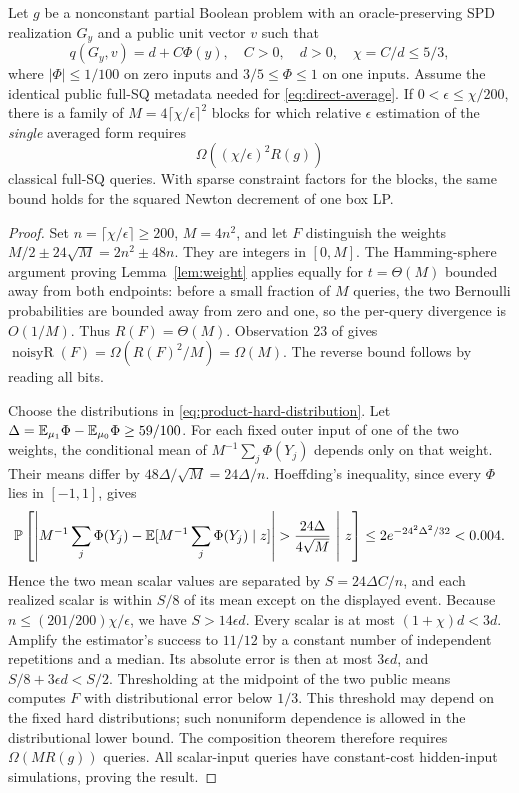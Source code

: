 \begin{theorem}\label{thm:distributional-product}
Let $g$ be a nonconstant partial Boolean problem with an oracle-preserving
SPD realization $G_y$ and a public unit vector $v$ such that
\begin{equation}\label{eq:single-form-signal}
 q(G_y,v)=d+C\Phi(y),\quad C>0,\quad d>0,\quad
 \chi=C/d\leq5/3,
\end{equation}
where $|\Phi|\leq1/100$ on zero inputs and $3/5\leq\Phi\leq1$ on
one inputs. Assume the identical public full-SQ metadata needed for
\eqref{eq:direct-average}. If $0<\epsilon\leq\chi/200$, there is a
family of $M=4\lceil\chi/\epsilon\rceil^2$ blocks for which relative
$\epsilon$ estimation of the \emph{single} averaged form requires
\begin{equation}\label{eq:distributional-product}
             \Omega((\chi/\epsilon)^2R(g))
\end{equation}
classical full-SQ queries. With sparse constraint factors for
the blocks, the same bound holds for the squared Newton decrement of one
box LP.
\end{theorem}
\begin{proof}
Set $n=\lceil\chi/\epsilon\rceil\geq200$, $M=4n^2$, and let $F$
distinguish the weights $M/2\pm24\sqrt M=2n^2\pm48n$.
They are integers in $[0,M]$. The Hamming-sphere argument proving
Lemma~\ref{lem:weight} applies equally for $t=\Theta(M)$ bounded away
from both endpoints: before a small fraction of $M$ queries, the two
Bernoulli probabilities are bounded away from zero and one, so the
per-query divergence is $O(1/M)$. Thus $R(F)=\Theta(M)$.
Observation 23 of \citet{ChakrabortyEtAl2023} gives
$\operatorname{noisyR}(F)=\Omega(R(F)^2/M)=\Omega(M)$.
The reverse bound follows by reading all bits.

Choose the distributions in \eqref{eq:product-hard-distribution}.
Let $\Delta=\mathbb E_{\mu_1}\Phi-\mathbb E_{\mu_0}\Phi\geq59/100$.
For each fixed outer input of one of the two weights, the conditional
mean of $M^{-1}\sum_j\Phi(Y_j)$ depends only on that weight.
Their means differ by $48\Delta/\sqrt M=24\Delta/n$.
Hoeffding's inequality, since every $\Phi$ lies in $[-1,1]$, gives
\[
 \mathbb P\left[\left|M^{-1}\sum_j\Phi(Y_j)
       -\mathbb E[M^{-1}\sum_j\Phi(Y_j)\mid z]\right|
       >\frac{24\Delta}{4\sqrt M}\ \middle|\ z\right]
 \leq2e^{-24^2\Delta^2/32}<0.004.
\]
Hence the two mean scalar values are separated by
$S=24\Delta C/n$, and each realized scalar is within $S/8$ of its
mean except on the displayed event. Because
$n\leq(201/200)\chi/\epsilon$, we have $S>14\epsilon d$.
Every scalar is at most $(1+\chi)d<3d$.
Amplify the estimator's success to $11/12$ by a constant number of
independent repetitions and a median. Its absolute error is then at
most $3\epsilon d$, and $S/8+3\epsilon d<S/2$.
Thresholding at the midpoint of the two public means computes $F$
with distributional error below $1/3$. This threshold may depend on
the fixed hard distributions; such nonuniform dependence is allowed
in the distributional lower bound. The composition theorem therefore
requires $\Omega(MR(g))$ queries. All scalar-input queries have
constant-cost hidden-input simulations, proving the result.
\end{proof}

